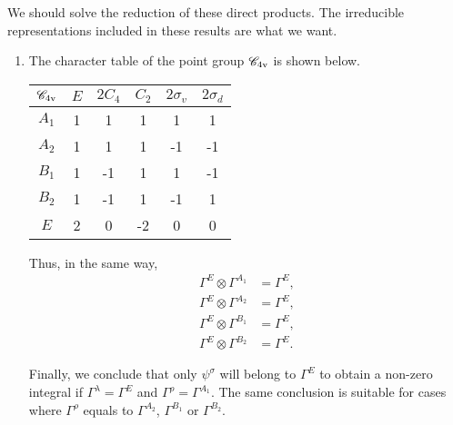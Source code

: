 \documentclass[a4paper]{book}
\begin{document}
	\begin{solution}
	
		We should solve the reduction of these direct products. The irreducible representations included in these results are what we want.
		
		\begin{enumerate}[label=(\alph*)]
		
		\item The character table of the point group $\mathscr{C}_{\rm 4v}$ is shown below.
		\begin{center}
		\begin{tabular}{cccccc}\hline
	$\mathscr{C}_{\rm 4v}$ & $E$ & $2C_4$ & $C_2$ & $2\sigma_v$ & $2\sigma_d$ \\ \hline
			$A_1$	&	1	&	1	&	1	&	1	&	1	\\
			$A_2$	&	1	&	1	&	1	&	-1	&	-1	\\
			$B_1$	&	1	&	-1	&	1	&	1	&	-1	\\
			$B_2$	&	1	&	-1	&	1	&	-1	&	1	\\
			$E$		&	2	&	0	&	-2	&	0	&	0\\ \hline
		\end{tabular}
		\end{center}
		Thus, in the same way,
		\begin{align}
			\Gamma^{E} \otimes \Gamma^{A_1} &= \Gamma^E , \\
			\Gamma^{E} \otimes \Gamma^{A_2} &= \Gamma^E , \\
			\Gamma^{E} \otimes \Gamma^{B_1} &= \Gamma^E , \\
			\Gamma^{E} \otimes \Gamma^{B_2} &= \Gamma^E .
		\end{align}
		
		Finally, we conclude that only $\psi^\sigma$ will belong to $\Gamma^E$ to obtain a non-zero integral if $\Gamma^\lambda = \Gamma^E$ and $\Gamma^\rho = \Gamma^{A_1}$. The same conclusion is suitable for cases where $\Gamma^\rho$ equals to $\Gamma^{A_2}$, $\Gamma^{B_1}$ or $\Gamma^{B_2}$.
		

\end{enumerate}
\end{solution}
\end{document}
